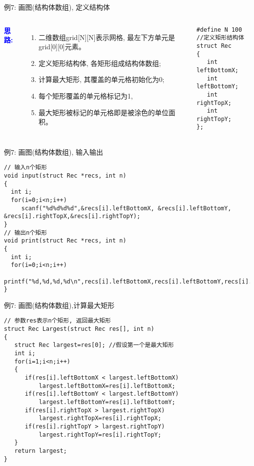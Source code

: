 \begin{frame}{例7: 画图(结构体数组), 定义结构体}
\begin{columns}[T]
\textbf{\textcolor{blue}{思路:}}
\begin{enumerate}
	\item 二维数组grid[N][N]表示网格, 最左下方单元是grid[0][0]元素。
	\item 定义矩形结构体, 各矩形组成结构体数组;
	\item 计算最大矩形, 其覆盖的单元格初始化为0; 
	\item 每个矩形覆盖的单元格标记为1, 
	\item 最大矩形被标记的单元格即是被涂色的单位面积。
\end{enumerate}
\begin{lstlisting}
#define N 100
//定义矩形结构体 
struct Rec
{
   int leftBottomX;
   int leftBottomY;
   int rightTopX;
   int rightTopY;
};
\end{lstlisting}
\end{columns}
\end{frame}

\begin{frame}{例7: 画图(结构体数组), 输入输出}
\vspace{-0.3cm}
\begin{lstlisting}
// 输入n个矩形
void input(struct Rec *recs, int n)
{
  int i;
  for(i=0;i<n;i++) 
     scanf("%d%d%d%d",&recs[i].leftBottomX, &recs[i].leftBottomY, &recs[i].rightTopX,&recs[i].rightTopY);
}
// 输出n个矩形
void print(struct Rec *recs, int n)
{
  int i;
  for(i=0;i<n;i++) 
    printf("%d,%d,%d,%d\n",recs[i].leftBottomX,recs[i].leftBottomY,recs[i].rightTopX,recs[i].rightTopY);
} 
\end{lstlisting}
\medskip
\end{frame}

\begin{frame}{例7: 画图(结构体数组),计算最大矩形}
\vspace{-0.3cm}
\begin{lstlisting}
// 参数res表示n个矩形, 返回最大矩形
struct Rec Largest(struct Rec res[], int n)
{
   struct Rec largest=res[0]; //假设第一个是最大矩形 
   int i;
   for(i=1;i<n;i++)
   {
      if(res[i].leftBottomX < largest.leftBottomX)
          largest.leftBottomX=res[i].leftBottomX;
      if(res[i].leftBottomY < largest.leftBottomY)
          largest.leftBottomY=res[i].leftBottomY;
      if(res[i].rightTopX > largest.rightTopX) 
          largest.rightTopX=res[i].rightTopX;
      if(res[i].rightTopY > largest.rightTopY) 
          largest.rightTopY=res[i].rightTopY;
   }
   return largest; 
} 
\end{lstlisting}
\end{frame}

